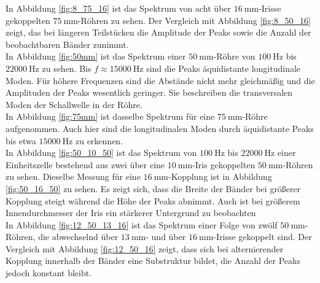 In Abbildung \ref{fig:8_75_16} ist das Spektrum von acht über $\SI{16}{\milli\meter}$-Irisse gekoppelten $\SI{75}{\milli\meter}$-Röhren zu sehen. Der Vergleich mit Abbildung \ref{fig:8_50_16} zeigt, das bei längeren Teilstücken die Amplitude der Peaks sowie die Anzahl der beobachtbaren Bänder zunimmt.\\
In Abbildung \ref{fig:50mm} ist das Spektrum einer $\SI{50}{\milli\meter}$-Röhre von $\SI{100}{\hertz}$ bis $\SI{22000}{\hertz}$ zu sehen. Bis $f\approx\SI{15000}{\hertz}$
sind die Peaks äquidistante longitudinale Moden. Für höhere Frequenzen sind die Abstände nicht mehr gleichmäßig und die Amplituden der Peaks wesentlich geringer. Sie beschreiben die transversalen Moden der Schallwelle in der Röhre.\\
In Abbildung \ref{fig:75mm} ist dasselbe Spektrum für eine $\SI{75}{\milli\meter}$-Röhre aufgenommen. Auch hier sind die longitudinalen Moden durch äquidistante Peaks bis etwa $\SI{15000}{\hertz}$ zu erkennen.\\
In Abbildung \ref{fig:50_10_50} ist das Spektrum von $\SI{100}{\hertz}$ bis $\SI{22000}{\hertz}$ einer Einheitszelle bestehend aus zwei über eine $\SI{10}{\milli\meter}$-Iris gekoppelten $\SI{50}{\milli\meter}$-Röhren zu sehen. Dieselbe Messung für eine $\SI{16}{\milli\meter}$-Kopplung ist in Abbildung \ref{fig:50_16_50} zu sehen. Es zeigt sich, dass die Breite der Bänder bei größerer Kopplung steigt während die Höhe der Peaks abnimmt. Auch ist bei größerem Innendurchmesser der Iris ein stärkerer Untergrund zu beobachten\\
In Abbildung \ref{fig:12_50_13_16} ist das Spektrum einer Folge von zwölf $\SI{50}{\milli\meter}$-Röhren, die abwechselnd über $\SI{13}{\milli\meter}$- und über $\SI{16}{\milli\meter}$-Irisse gekoppelt sind. Der Vergleich mit Abbildung \ref{fig:12_50_16} zeigt, dass sich bei alternierender Kopplung innerhalb der Bänder eine Substruktur bildet, die Anzahl der Peaks jedoch konstant bleibt.



